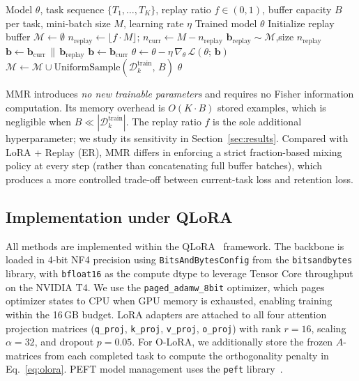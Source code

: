 \begin{algorithm}[t]
\caption{Minimal Mixed Rehearsal (MMR)}
\label{alg:mmr}
\begin{algorithmic}[1]
\REQUIRE Model $\theta$, task sequence $\{T_1,\ldots,T_K\}$, replay ratio $f \in (0,1)$,
         buffer capacity $B$ per task, mini-batch size $M$, learning rate $\eta$
\ENSURE  Trained model $\theta$
\STATE Initialize replay buffer $\mathcal{M} \leftarrow \emptyset$
  \STATE $n_{\mathrm{replay}} \leftarrow \lfloor f \cdot M \rfloor$;\quad
         $n_{\mathrm{curr}}   \leftarrow M - n_{\mathrm{replay}}$
      \STATE $\mathbf{b}_{\mathrm{replay}} \sim \mathcal{M}$,\quad size $n_{\mathrm{replay}}$
      \STATE $\mathbf{b} \leftarrow \mathbf{b}_{\mathrm{curr}} \,\|\,
             \mathbf{b}_{\mathrm{replay}}$ 
    \ELSE
      \STATE $\mathbf{b} \leftarrow \mathbf{b}_{\mathrm{curr}}$
    \ENDIF
    \STATE $\theta \leftarrow \theta - \eta\,\nabla_\theta\,\mathcal{L}(\theta;\,\mathbf{b})$
  \ENDFOR
  \STATE $\mathcal{M} \leftarrow \mathcal{M} \cup
         \mathrm{UniformSample}(\mathcal{D}_k^{\mathrm{train}},\,B)$
\ENDFOR
\RETURN $\theta$
\end{algorithmic}
\end{algorithm}

MMR introduces \emph{no new trainable parameters} and requires no Fisher information computation.
Its memory overhead is $O(K \cdot B)$ stored examples, which is negligible when $B \ll
|\mathcal{D}_k^{\mathrm{train}}|$.
The replay ratio $f$ is the sole additional hyperparameter; we study its sensitivity in
Section~\ref{sec:results}.
Compared with LoRA + Replay (ER), MMR differs in enforcing a strict fraction-based mixing policy
at every step (rather than concatenating full buffer batches), which produces a more controlled
trade-off between current-task loss and retention loss.

\subsection{Implementation under QLoRA}

All methods are implemented within the QLoRA~\cite{dettmers2023qlora} framework.
The backbone is loaded in 4-bit NF4 precision using \texttt{BitsAndBytesConfig} from the
\texttt{bitsandbytes} library, with \texttt{bfloat16} as the compute dtype to leverage Tensor Core
throughput on the NVIDIA T4.
We use the \texttt{paged\_adamw\_8bit} optimizer, which pages optimizer states to CPU when GPU
memory is exhausted, enabling training within the 16\,GB budget.
LoRA adapters are attached to all four attention projection matrices
(\texttt{q\_proj}, \texttt{k\_proj}, \texttt{v\_proj}, \texttt{o\_proj}) with rank $r{=}16$,
scaling $\alpha{=}32$, and dropout $p{=}0.05$.
For O-LoRA, we additionally store the frozen $A$-matrices from each completed task to compute the
orthogonality penalty in Eq.~\ref{eq:olora}.
PEFT model management uses the \texttt{peft} library~\cite{mangrulkar2022peft}.

